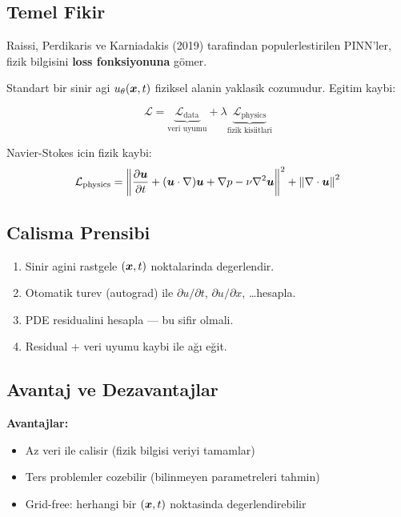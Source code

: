 \subsection{Temel Fikir}

Raissi, Perdikaris ve Karniadakis (2019) tarafindan populerlestirilen PINN'ler, fizik bilgisini \textbf{loss fonksiyonuna} gömer.

Standart bir sinir agi $u_\theta(\bm{x}, t)$ fiziksel alanin yaklasik cozumudur. Egitim kaybi:

\begin{equation}
\mathcal{L} = \underbrace{\mathcal{L}_{\text{data}}}_{\text{veri uyumu}} + \lambda\underbrace{\mathcal{L}_{\text{physics}}}_{\text{fizik kisiitlari}}
\label{eq:pinn_loss}
\end{equation}

Navier-Stokes icin fizik kaybi:
\begin{equation}
\mathcal{L}_{\text{physics}} = \left\|\frac{\partial \bm{u}}{\partial t} + (\bm{u}\cdot\nabla)\bm{u} + \nabla p - \nu\nabla^2\bm{u}\right\|^2 + \left\|\nabla \cdot\bm{u}\right\|^2
\label{eq:pinn_physics}
\end{equation}

\subsection{Calisma Prensibi}

\begin{enumerate}
\item Sinir agini rastgele $(\bm{x}, t)$ noktalarinda degerlendir.
\item Otomatik turev (autograd) ile $\partial u/\partial t$, $\partial u/\partial x$, \ldots hesapla.
\item PDE residualini hesapla --- bu sifir olmali.
\item Residual + veri uyumu kaybi ile ağı eğit.
\end{enumerate}

\subsection{Avantaj ve Dezavantajlar}

\textbf{Avantajlar:}
\begin{itemize}
\item Az veri ile calisir (fizik bilgisi veriyi tamamlar)
\item Ters problemler cozebilir (bilinmeyen parametreleri tahmin)
\item Grid-free: herhangi bir $(\bm{x},t)$ noktasinda degerlendirebilir
\end{itemize}

